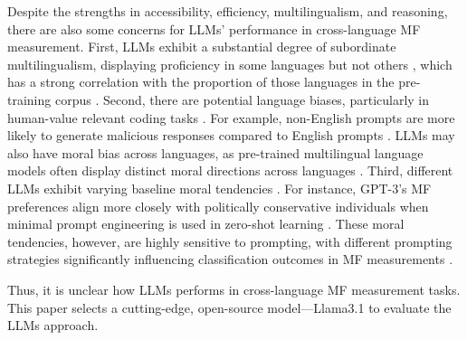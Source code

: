 Despite the strengths in accessibility, efficiency, multilingualism, and reasoning, there are also some concerns for LLMs' performance in cross-language MF measurement. First, LLMs exhibit a substantial degree of subordinate multilingualism, displaying proficiency in some languages but not others \citep{zhang2023don}, which has a strong correlation with the proportion of those languages in the pre-training corpus \citep{li2024quantifying}. Second, there are potential language biases, particularly in human-value relevant coding tasks \citep{kirk2024PRISM}. For example, non-English prompts are more likely to generate malicious responses compared to English prompts \citep{shen2024language}. LLMs may also have moral bias across languages, as pre-trained multilingual language models often display distinct moral directions across languages \citep{hammerl2022speaking}. %
Third, different LLMs exhibit varying baseline moral tendencies \citep{ji2024moralbench}. For instance, GPT-3’s MF preferences align more closely with politically conservative individuals when minimal prompt engineering is used in zero-shot learning \citep{abdulhai2023moral}. These moral tendencies, however, are highly sensitive to prompting, with different prompting strategies significantly influencing classification outcomes in MF measurements \citep{abdulhai2023moral}.

Thus, it is unclear how LLMs performs in cross-language MF measurement tasks. This paper selects a cutting-edge, open-source model---Llama3.1 \citep{dubey2024llama} to evaluate the LLMs approach.